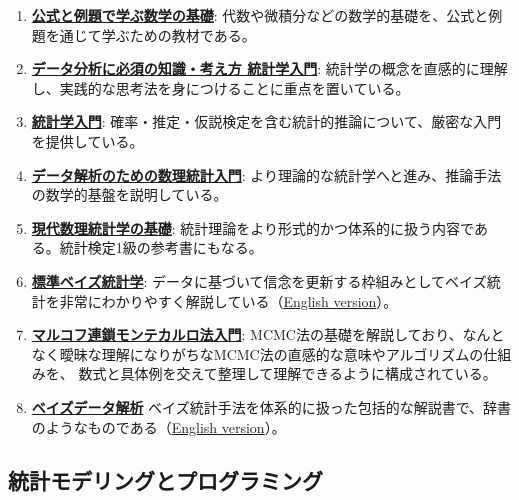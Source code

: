 \documentclass[uplatex]{jsarticle} %
\begin{document}
\begin{enumerate}
\item \href{https://www.kyoritsu-pub.co.jp/book/b10123480.html}{\textbf{公式と例題で学ぶ数学の基礎}}:
代数や微積分などの数学的基礎を、公式と例題を通じて学ぶための教材である。

\item \href{https://www.socym.co.jp/book/1319}{\textbf{データ分析に必須の知識・考え方 統計学入門}}: 
統計学の概念を直感的に理解し、実践的な思考法を身につけることに重点を置いている。

\item \href{https://www.utp.or.jp/book/b300857.html}{\textbf{統計学入門}}: 
確率・推定・仮説検定を含む統計的推論について、厳密な入門を提供している。

\item \href{https://www.kyoritsu-pub.co.jp/book/b10033628.html}{\textbf{データ解析のための数理統計入門}}: 
より理論的な統計学へと進み、推論手法の数学的基盤を説明している。

\item \href{https://www.kyoritsu-pub.co.jp/book/b10003681.html}{\textbf{現代数理統計学の基礎}}: 
統計理論をより形式的かつ体系的に扱う内容である。統計検定1級の参考書にもなる。

\item \href{https://www.asakura.co.jp/detail.php?book_code=12267}{\textbf{標準ベイズ統計学}}:
データに基づいて信念を更新する枠組みとしてベイズ統計を非常にわかりやすく解説している（\href{https://sites.math.rutgers.edu/~zeilberg/EM20/Hoff.pdf}{English version}）。

\item \href{https://www.tokyo-tosho.co.jp/02452/}{\textbf{マルコフ連鎖モンテカルロ法入門}}: 
MCMC法の基礎を解説しており、なんとなく曖昧な理解になりがちなMCMC法の直感的な意味やアルゴリズムの仕組みを、
数式と具体例を交えて整理して理解できるように構成されている。

\item \href{https://www.morikita.co.jp/books/mid/009703}{\textbf{ベイズデータ解析}} 
ベイズ統計手法を体系的に扱った包括的な解説書で、辞書のようなものである（\href{https://sites.stat.columbia.edu/gelman/book/BDA3.pdf}{English version}）。
\end{enumerate}

\subsection{統計モデリングとプログラミング}
\end{document}
